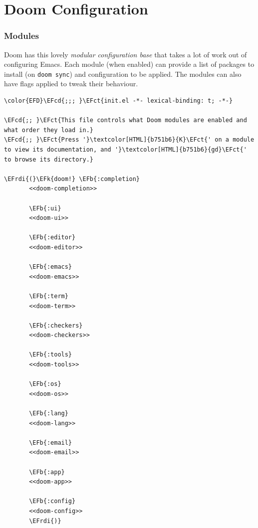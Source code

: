 \documentclass{scrartcl}
\newcommand{\EFk}[1]{\textcolor{EFk}{#1}} %
\newcommand{\EFb}[1]{\textcolor{EFb}{#1}} %
\newcommand{\EFct}[1]{\textcolor{EFct}{#1}} %
\newcommand{\EFcd}[1]{\textcolor{EFcd}{#1}} %
\newcommand{\EFrdi}[1]{\textcolor{EFrdi}{#1}} %
\begin{document}
\section{Doom Configuration}
\label{sec:org57fbc0c}
\subsubsection{Modules}
\label{sec:orgc2ce7c6}
Doom has this lovely \emph{modular configuration base} that takes a lot of work out of
configuring Emacs. Each module (when enabled) can provide a list of packages to
install (on \texttt{doom sync}) and configuration to be applied. The modules can also
have flags applied to tweak their behaviour.

\begin{Code}
\begin{Verbatim}[]
\color{EFD}\EFcd{;;; }\EFct{init.el -*- lexical-binding: t; -*-}

\EFcd{;; }\EFct{This file controls what Doom modules are enabled and what order they load in.}
\EFcd{;; }\EFct{Press '}\textcolor[HTML]{b751b6}{K}\EFct{' on a module to view its documentation, and '}\textcolor[HTML]{b751b6}{gd}\EFct{' to browse its directory.}

\EFrdi{(}\EFk{doom!} \EFb{:completion}
       <<doom-completion>>

       \EFb{:ui}
       <<doom-ui>>

       \EFb{:editor}
       <<doom-editor>>

       \EFb{:emacs}
       <<doom-emacs>>

       \EFb{:term}
       <<doom-term>>

       \EFb{:checkers}
       <<doom-checkers>>

       \EFb{:tools}
       <<doom-tools>>

       \EFb{:os}
       <<doom-os>>

       \EFb{:lang}
       <<doom-lang>>

       \EFb{:email}
       <<doom-email>>

       \EFb{:app}
       <<doom-app>>

       \EFb{:config}
       <<doom-config>>
       \EFrdi{)}
\end{Verbatim}
\end{Code}
\end{document}
